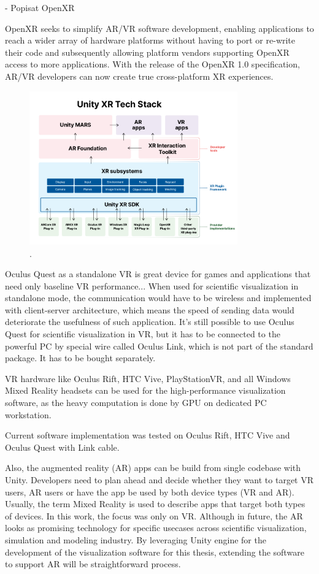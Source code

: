 - Popisat OpenXR

OpenXR seeks to simplify AR/VR software development, enabling applications to reach a wider array of hardware platforms without having to port or re-write their code and subsequently allowing platform vendors supporting OpenXR access to more applications. With the release of the OpenXR 1.0 specification, AR/VR developers can now create true cross-platform XR experiences.

\begin{figure}[!ht]
	\centering
	\includegraphics[width=0.8\textwidth]{figures/unity-xr-tech-stack.png}
	\caption{.}
	\label{fig:unity-xr-tech-stack}
\end{figure}

Oculus Quest as a standalone VR is great device for games and applications that need only baseline VR performance... When used for scientific visualization in standalone mode, the communication would have to be wireless and implemented with client-server architecture, which means the speed of sending data would deteriorate the usefulness of such application. It's still possible to use Oculus Quest for scientific visualization in VR, but it has to be connected to the powerful PC by special wire called Oculus Link, which is not part of the standard package. It has to be bought separately.

VR hardware like Oculus Rift, HTC Vive, PlayStationVR, and all Windows Mixed Reality headsets can be used for the high-performance visualization software, as the heavy computation is done by GPU on dedicated PC workstation.

Current software implementation was tested on Oculus Rift, HTC Vive and Oculus Quest with Link cable.

Also, the augmented reality (AR) apps can be build from single codebase with Unity. Developers need to plan ahead and decide whether they want to target VR users, AR users or have the app be used by both device types (VR and AR). Usually, the term Mixed Reality is used to describe apps that target both types of devices. In this work, the focus was only on VR. Although in future, the AR looks as promising technology for specific usecases across scientific visualization, simulation and modeling industry. By leveraging Unity engine for the development of the visualization software for  this thesis, extending the software to support AR will be straightforward process.

